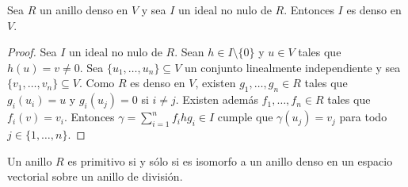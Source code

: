 \begin{lemma}
	\label{lem:ideal_denso}
	Sea $R$ un anillo denso en $V$ y sea $I$ un ideal no nulo de $R$. Entonces
	$I$ es denso en $V$.
\end{lemma}

\begin{proof}
	Sea $I$ un ideal no nulo de $R$. Sean $h\in I\setminus\{0\}$ y $u\in V$
	tales que $h(u)=v\ne0$. Sea $\{u_1,\dots,u_n\}\subseteq V$ un conjunto
	linealmente independiente y sea $\{v_1,\dots,v_n\}\subseteq V$. Como $R$ es
	denso en $V$, existen $g_1,\dots,g_n\in R$ tales que $g_i(u_i)=u$ y
	$g_i(u_j)=0$ si $i\ne j$. Existen además $f_1,\dots,f_n\in R$ tales que
	$f_i(v)=v_i$. Entonces $\gamma=\sum_{i=1}^n f_ihg_i\in I$ cumple que
	$\gamma(u_j)=v_j$ para todo $j\in\{1,\dots,n\}$.
\end{proof}

%
%
%
%

\begin{theorem}
	\label{thm:densidad}
	Un anillo $R$ es primitivo si y sólo si es isomorfo a un anillo denso en un
	espacio vectorial sobre un anillo de división.
\end{theorem}

